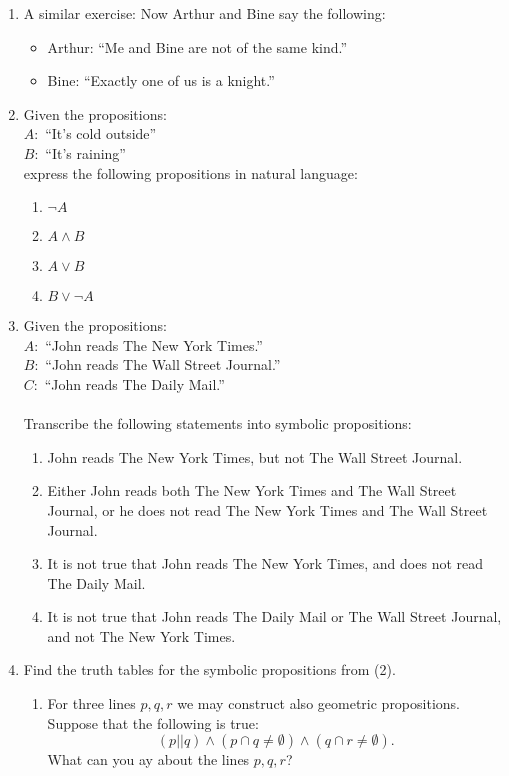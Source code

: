 \documentclass[11pt,paper=b5,footinclude,headinclude]{scrbook} %
\theoremstyle{remark}
\theoremstyle{definition} %
\theoremstyle{theorem} %
\begin{document}
\begin{enumerate}
\item {A similar exercise:}
Now Arthur and Bine say the following:
\begin{itemize}
 \item Arthur: ``Me and Bine are not of the same kind.''
 \item Bine: ``Exactly one of us is a knight.''
\end{itemize}
\item Given the propositions:\\
$A:$ ``It's cold outside''\\
$B:$ ``It's raining''\\
express the following propositions in natural language:
\begin{enumerate}
\item $\neg A$
\item $A\wedge B$
\item $A\vee B$
\item $B\vee\neg A$
\end{enumerate}
\item Given the propositions:\\
$A:$ ``John reads The New York Times.''\\
$B:$ ``John reads The Wall Street Journal.''\\
$C:$ ``John reads The Daily Mail.''\\
\\
Transcribe the following statements into symbolic propositions:
\begin{enumerate}
\item John reads The New York Times, but not The Wall Street Journal.
\item Either John reads both The New York Times and The Wall Street Journal,
or he does not read The New York Times and The Wall Street Journal.
\item It is not true that John reads The New York Times, and does not read
The Daily Mail.
\item It is not true that John reads The Daily Mail or The Wall Street Journal,
and not The New York Times.
\end{enumerate}
\item Find the truth tables for the symbolic propositions from (2).
\begin{enumerate}
\item For three lines $p,q,r$ we may construct also geometric propositions.
Suppose that the following is true:
\[
(p||q)\wedge(p\cap q\neq\emptyset)\wedge(q\cap r\neq\emptyset).
\]
What can you ay about the lines $p,q,r$?

\end{enumerate}
\end{enumerate}
\end{document}
